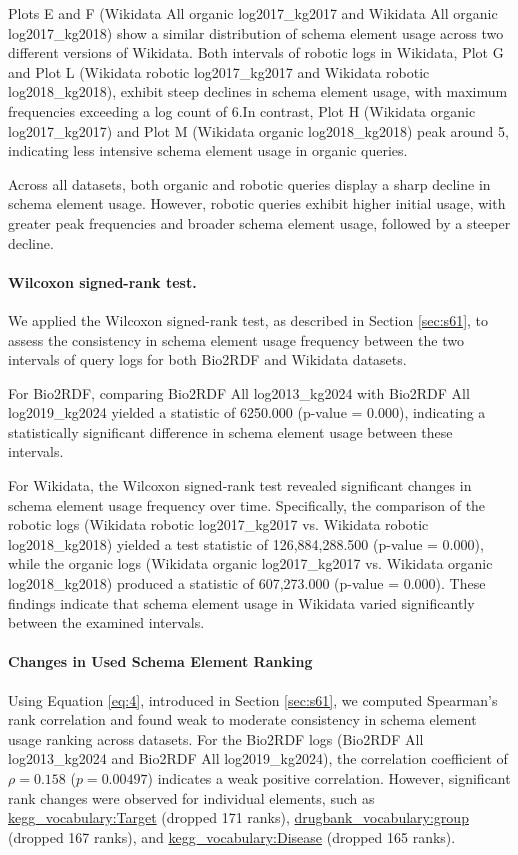 \documentclass[sw]{iosart2x}
\begin{document}
Plots E and F (Wikidata All organic log2017\_kg2017 and Wikidata All organic log2017\_kg2018) show a similar distribution of schema element usage across two different versions of Wikidata. Both intervals of robotic logs in Wikidata, Plot G and Plot L (Wikidata robotic log2017\_kg2017 and Wikidata robotic log2018\_kg2018), exhibit steep declines in schema element usage, with maximum frequencies exceeding a log count of 6.In contrast, Plot H (Wikidata organic log2017\_kg2017) and Plot M (Wikidata organic log2018\_kg2018) peak around 5, indicating less intensive schema element usage in organic queries.

Across all datasets, both organic and robotic queries display a sharp decline in schema element usage. However, robotic queries exhibit higher initial usage, with greater peak frequencies and broader schema element usage, followed by a steeper decline.

\paragraph{\textbf{Wilcoxon signed-rank test.}}We applied the Wilcoxon signed-rank test, as described in Section \ref{sec:s61}, to assess the consistency in schema element usage frequency between the two intervals of query logs for both Bio2RDF and Wikidata datasets.

For Bio2RDF, comparing Bio2RDF All log2013\_kg2024 with Bio2RDF All log2019\_kg2024 yielded a statistic of 6250.000 (p-value = 0.000), indicating a statistically significant difference in schema element usage between these intervals.

For Wikidata, the Wilcoxon signed‐rank test revealed significant changes in schema element usage frequency over time. Specifically, the comparison of the robotic logs (Wikidata robotic log2017\_kg2017 vs. Wikidata robotic log2018\_kg2018) yielded a test statistic of 126,884,288.500 (p-value = 0.000), while the organic logs (Wikidata organic log2017\_kg2017 vs. Wikidata organic log2018\_kg2018) produced a statistic of 607,273.000 (p-value = 0.000). These findings indicate that schema element usage in Wikidata varied significantly between the examined intervals.

\paragraph{\textbf{Changes in Used Schema Element Ranking}}
Using Equation \ref{eq:4}, introduced in Section \ref{sec:s61}, we computed Spearman's rank correlation and found weak to moderate consistency in schema element usage ranking across datasets. For the Bio2RDF logs (Bio2RDF All log2013\_kg2024 and Bio2RDF All log2019\_kg2024), the correlation coefficient of $\rho = 0.158$ ($p = 0.00497$) indicates a weak positive correlation. However, significant rank changes were observed for individual elements, such as \sloppy  %
\href{http://bio2rdf.org/kegg_vocabulary:Target}{kegg\_vocabulary:Target} (dropped 171 ranks), \href{http://bio2rdf.org/drugbank_vocabulary:group}{drugbank\_vocabulary:group} (dropped 167 ranks), and \href{http://bio2rdf.org/kegg_vocabulary:Disease}{kegg\_vocabulary:Disease} (dropped 165 ranks).
\end{document}
